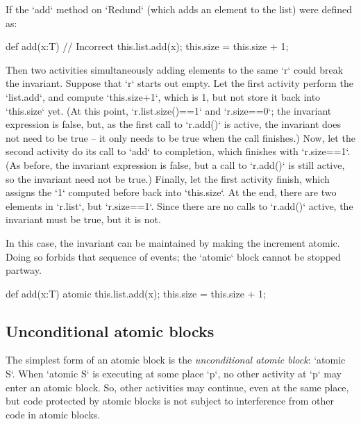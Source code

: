 If the \xcd`add` method on \xcd`Redund` (which adds an element to the list) 
were defined as: 
\begin{xten}
def add(x:T) { // Incorrect
  this.list.add(x);
  this.size = this.size + 1;
}
\end{xten}
Then two activities simultaneously adding elements to the same \xcd`r` could break the
invariant.  Suppose that \xcd`r` starts out empty.  Let the first activity
perform the \xcd`list.add`, and compute \xcd`this.size+1`, which is 1, but not store it
back into \xcd`this.size` yet.  
(At this point, \xcd`r.list.size()==1` and \xcd`r.size==0`; the invariant
expression is false, but, as the first call to \xcd`r.add()` is active, the
invariant does not need to be true -- it only needs to be true when the
call finishes.)
Now, let the second activity do its call to
\xcd`add` to completion, which finishes with \xcd`r.size==1`.  
(As before, the invariant expression is false, but a call to \xcd`r.add()` is
still active, so the invariant need not be true.)
Finally, let
the first activity finish, which assigns the \xcd`1` computed before back into
\xcd`this.size`.  At the end, there are two elements in \xcd`r.list`, but
\xcd`r.size==1`. Since there are no calls to \xcd`r.add()` active, the
invariant must be true, but it is not.

In this case, the invariant can be maintained by making the increment atomic.
Doing so forbids that sequence of events; the \xcd`atomic` block cannot be
stopped partway.  
\begin{xten}
def add(x:T) { 
  atomic {
    this.list.add(x);
    this.size = this.size + 1; 
  }
}
\end{xten}

\subsection{Unconditional atomic blocks}
The simplest form of an atomic block is the {\em unconditional
atomic block}: \xcd`atomic S`.
When \xcd`atomic S` is executing at some place \xcd`p`, no other activity at
\xcd`p` may enter an atomic block.  
So, other activities may continue, even at the same place, but code protected
by atomic blocks is not subject to interference from other code in atomic
blocks. 

